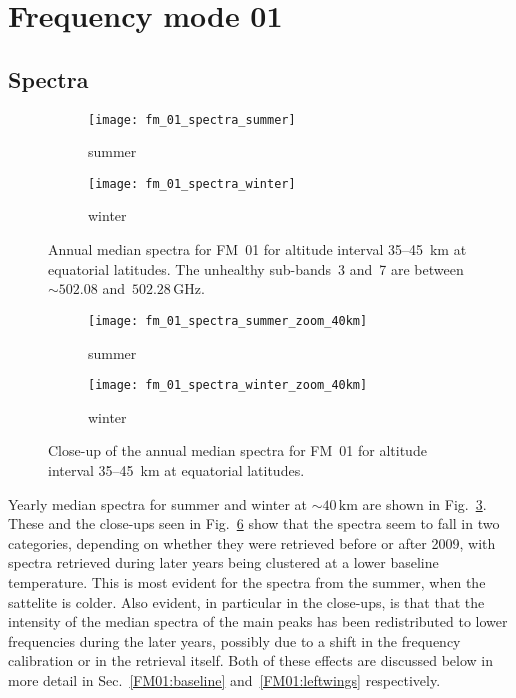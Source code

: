 \section{Frequency mode 01}
\label{FM01}

\subsection{Spectra}
\label{FM01:spectra}

\begin{figure}[ht]
    \centering
    \begin{subfigure}[b]{0.9545\textwidth}
        \texttt{[image: fm\_01\_spectra\_summer]}
        \caption{summer}\label{fig:spectra:01:summer}
    \end{subfigure}
    \begin{subfigure}[b]{0.9545\textwidth}
        \texttt{[image: fm\_01\_spectra\_winter]}
        \caption{winter}\label{fig:spectra:01:winter}
    \end{subfigure}
    \caption{Annual median spectra for FM~01 for altitude interval 35--45~km at
        equatorial latitudes. The unhealthy sub-bands~3 and~7 are between
        $\sim502.08$ and~$502.28\,\mathrm{GHz}$.
        }\label{fig:spectra:01}
\end{figure}

\begin{figure}[ht]
    \centering
    \begin{subfigure}[b]{0.9545\textwidth}
        \texttt{[image: fm\_01\_spectra\_summer\_zoom\_40km]}
        \caption{summer}\label{fig:spectra:01:summer:closeup}
    \end{subfigure}
    \begin{subfigure}[b]{0.9545\textwidth}
        \texttt{[image: fm\_01\_spectra\_winter\_zoom\_40km]}
        \caption{winter}\label{fig:spectra:01:winter:closeup}
    \end{subfigure}
    \caption{Close-up of the annual median spectra for FM~01 for altitude
        interval 35--45~km at equatorial latitudes.
        }\label{fig:spectra:01:closeup}
\end{figure}

\noindent
Yearly median spectra for summer and winter at $\sim40\,\mathrm{km}$ are shown
in Fig.~\ref{fig:spectra:01}.  These and the close-ups seen in
Fig.~\ref{fig:spectra:01:closeup} show that the spectra seem to fall in two
categories, depending on whether they were retrieved before or after 2009, with
spectra retrieved during later years being clustered at a lower baseline
temperature.  This is most evident for the spectra from the summer, when the
sattelite is colder.  Also evident, in particular in the close-ups, is that
that the intensity of the median spectra of the main peaks has been
redistributed to lower frequencies during the later years, possibly due to a
shift in the frequency calibration or in the retrieval itself.  Both of these
effects are discussed below in more detail in Sec.~\ref{FM01:baseline}
and~\ref{FM01:leftwings} respectively.


